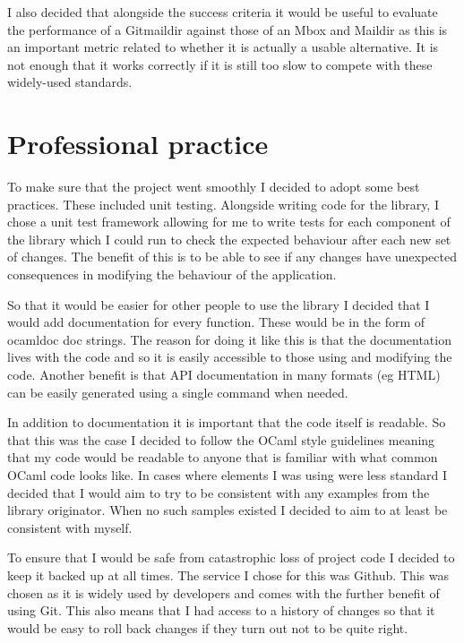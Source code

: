 I also decided that alongside the success criteria it would be useful to evaluate the performance of a Gitmaildir against those of an Mbox and Maildir as this is an important metric related to whether it is actually a usable alternative. It is not enough that it works correctly if it is still too slow to compete with these widely-used standards.

\section{Professional practice}

To make sure that the project went smoothly I decided to adopt some best practices. These included unit testing. Alongside writing code for the library, I chose a unit test framework allowing for me to write tests for each component of the library which I could run to check the expected behaviour after each new set of changes. The benefit of this is to be able to see if any changes have unexpected consequences in modifying the behaviour of the application.

So that it would be easier for other people to use the library I decided that I would add documentation for every function. These would be in the form of ocamldoc doc strings. The reason for doing it like this is that the documentation lives with the code and so it is easily accessible to those using and modifying the code. Another benefit is that API documentation in many formats (eg HTML) can be easily generated using a single command when needed.

In addition to documentation it is important that the code itself is readable. So that this was the case I decided to follow the OCaml style guidelines\cite{ocaml_guidelines} meaning that my code would be readable to anyone that is familiar with what common OCaml code looks like. In cases where elements I was using were less standard I decided that I would aim to try to be consistent with any examples from the library originator. When no such samples existed I decided to aim to at least be consistent with myself.

To ensure that I would be safe from catastrophic loss of project code I decided to keep it backed up at all times. The service I chose for this was Github. This was chosen as it is widely used by developers and comes with the further benefit of using Git. This also means that I had access to a history of changes so that it would be easy to roll back changes if they turn out not to be quite right.
